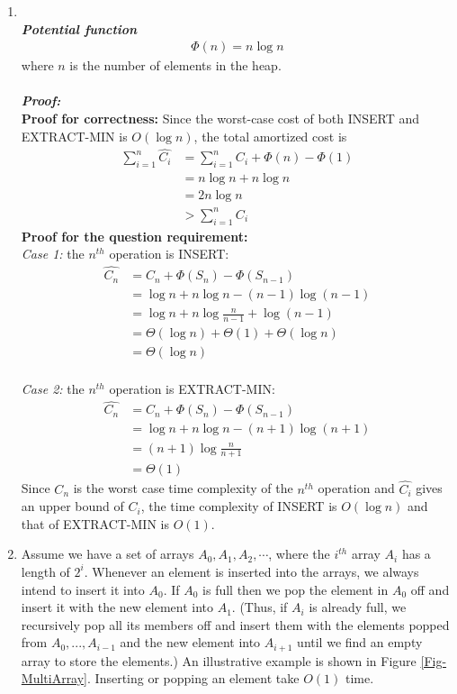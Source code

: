 \documentclass[12pt,a4paper]{article}
\makeatletter
\newtheorem*{solution}{Solution}
\theoremstyle{definition}
\renewenvironment{solution}[1][Solution] {\par\pushQED{\qed}\normalfont\topsep6\p@\@plus6\p@\relax\trivlist\item[\hskip\labelsep\bfseries#1\@addpunct{.}]\ignorespaces}{\popQED\endtrivlist\@endpefalse} \makeatother
\makeatother
\begin{document}
\begin{enumerate}
\begin{solution}
	\\
	\textbf{\textit{Potential function}}
    \begin{align}
        \Phi(n)=n\log n 
    \end{align}
    where $n$ is the number of elements in the heap.
    \\
    \\
    \textbf{\textit{Proof:}}
    \\
    \textbf{Proof for correctness:}
    Since the worst-case cost of both \textsc{INSERT} and \textsc{EXTRACT-MIN} is $O(\log n)$, the total amortized cost is 
    \begin{align*}
        \sum_{i=1}^n \hat{C_i}
        &= \sum_{i=1}^n C_i+\Phi (n)-\Phi (1)\\
        &= n\log n+n\log n\\
        &= 2n\log n\\
        &> \sum_{i=1}^n C_i
    \end{align*}
    \textbf{Proof for the question requirement:}
    \\
    \textit{Case 1:} the $n^{th}$ operation is \textsc{INSERT:}
    \begin{align}
        \hat{C_n}
        &= C_n+\Phi(S_{n})-\Phi(S_{n-1})\\
        &= \log n+n\log n- (n-1)\log (n-1)\\
        &= \log n+n\log \frac{n}{n-1}+\log (n-1)\\
        &= \Theta(\log n)+ \Theta(1) + \Theta(\log n)\\
        &= \Theta(\log n)
    \end{align}
    \\
    \textit{Case 2:} the $n^{th}$ operation is \textsc{EXTRACT-MIN:}
    \begin{align}
        \hat{C_n}
        &= C_n+\Phi(S_n)-\Phi(S_{n-1})\\
        &= \log n+n\log n- (n+1)\log (n+1)\\
        &= (n+1)\log \frac{n}{n+1}\\
        &= \Theta(1)
    \end{align}
    Since $C_n$ is the worst case time complexity of the $n^{th}$ operation and $\hat{C_i}$ gives an upper bound of $C_i$, the time complexity of \textsc{INSERT} is $O(\log n)$ and that of \textsc{EXTRACT-MIN} is $O(1)$.
    
    \end{solution}	
	
	\item Assume we have a set of arrays $A_0, A_1, A_2,\cdots$, where the $i^{th}$ array $A_i$ has a length of $2^i$. Whenever an element is inserted into the arrays, we always intend to insert it into $A_0$. If $A_0$ is full then we pop the element in $A_0$ off and insert it with the new element into $A_{1}$. (Thus, if $A_{i}$ is already full, we recursively pop all its members off and insert them with the elements popped from $A_0,...,A_{i-1}$ and the new element into $A_{i+1}$ until we find an empty array to store the elements.) An illustrative example is shown in Figure \ref{Fig-MultiArray}. Inserting or popping an element take $O(1)$ time.


\end{enumerate}
\end{document}
